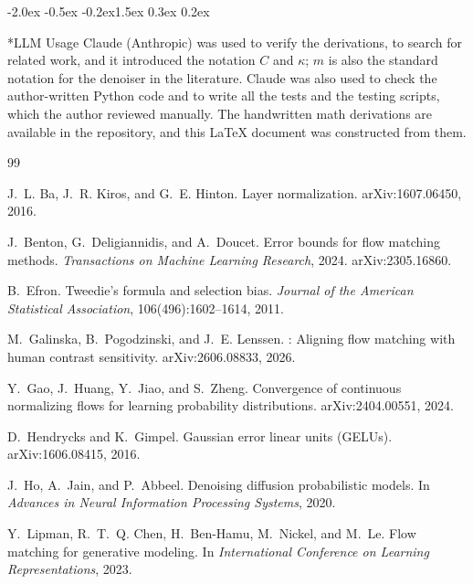\documentclass{article}
\makeatletter
\renewcommand{\section}{\@startsection{section}{1}{\z@}%
  {-2.0ex \@plus -0.5ex \@minus -0.2ex}{1.5ex \@plus 0.3ex \@minus 0.2ex}{\large\bfseries\raggedright}}
\theoremstyle{remark}
\makeatother
\begin{document}
\section*{LLM Usage}
Claude (Anthropic) was used to verify the derivations, to search for related work, and it introduced the notation $C$ and $\kappa$; $m$ is also the standard notation for the denoiser in the literature. Claude was also used to check the author-written Python code and to write all the tests and the testing scripts, which the author reviewed manually. The handwritten math derivations are available in the repository, and this \LaTeX{} document was constructed from them.

\begin{thebibliography}{99}

J.~L. Ba, J.~R. Kiros, and G.~E. Hinton.
\newblock Layer normalization.
\newblock arXiv:1607.06450, 2016.

J.~Benton, G.~Deligiannidis, and A.~Doucet.
\newblock Error bounds for flow matching methods.
\newblock \emph{Transactions on Machine Learning Research}, 2024.
\newblock arXiv:2305.16860.

B.~Efron.
\newblock Tweedie's formula and selection bias.
\newblock \emph{Journal of the American Statistical Association}, 106(496):1602--1614, 2011.

M.~Galinska, B.~Pogodzinski, and J.~E. Lenssen.
: Aligning flow matching with human contrast sensitivity.
\newblock arXiv:2606.08833, 2026.

Y.~Gao, J.~Huang, Y.~Jiao, and S.~Zheng.
\newblock Convergence of continuous normalizing flows for learning probability distributions.
\newblock arXiv:2404.00551, 2024.

D.~Hendrycks and K.~Gimpel.
\newblock Gaussian error linear units (GELUs).
\newblock arXiv:1606.08415, 2016.

J.~Ho, A.~Jain, and P.~Abbeel.
\newblock Denoising diffusion probabilistic models.
\newblock In \emph{Advances in Neural Information Processing Systems}, 2020.

Y.~Lipman, R.~T.~Q. Chen, H.~Ben-Hamu, M.~Nickel, and M.~Le.
\newblock Flow matching for generative modeling.
\newblock In \emph{International Conference on Learning Representations}, 2023.


\end{thebibliography}
\end{document}

